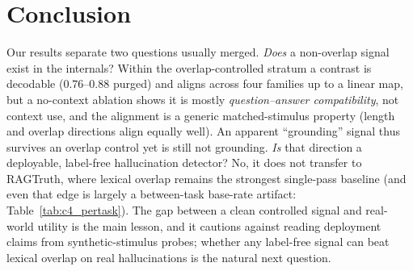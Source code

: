 \section{Conclusion}
\label{sec:conclusion}
Our results separate two questions usually merged. \emph{Does} a non-overlap signal
exist in the internals? Within the overlap-controlled stratum a contrast is decodable
($0.76$--$0.88$ purged) and aligns across four families up to a linear map, but a
no-context ablation shows it is mostly \emph{question--answer
compatibility}, not context use, and the alignment is a generic matched-stimulus
property (length and overlap directions align equally well). An apparent ``grounding''
signal thus survives an overlap control yet is still not grounding. \emph{Is} that
direction a deployable, label-free hallucination detector? No, it does not transfer to
RAGTruth, where lexical overlap remains the strongest single-pass baseline (and even
that edge is largely a between-task base-rate artifact: Table~\ref{tab:c4_pertask}).
The gap between a clean controlled signal and real-world utility is the main lesson, and
it cautions against reading deployment claims from synthetic-stimulus probes; whether
any label-free signal can beat lexical overlap on real hallucinations is the natural
next question.

